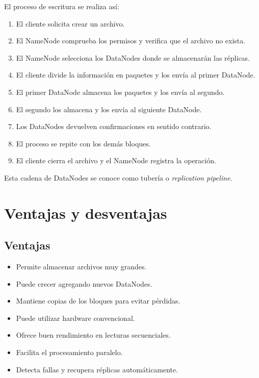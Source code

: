 El proceso de escritura se realiza así:

\begin{enumerate}
    \item El cliente solicita crear un archivo.
    \item El NameNode comprueba los permisos y verifica que el archivo no
    exista.
    \item El NameNode selecciona los DataNodes donde se almacenarán las
    réplicas.
    \item El cliente divide la información en paquetes y los envía al primer
    DataNode.
    \item El primer DataNode almacena los paquetes y los envía al segundo.
    \item El segundo los almacena y los envía al siguiente DataNode.
    \item Los DataNodes devuelven confirmaciones en sentido contrario.
    \item El proceso se repite con los demás bloques.
    \item El cliente cierra el archivo y el NameNode registra la operación.
\end{enumerate}

Esta cadena de DataNodes se conoce como tubería o
\textit{replication pipeline}.

\section{Ventajas y desventajas}

\subsection{Ventajas}

\begin{itemize}
    \item Permite almacenar archivos muy grandes.
    \item Puede crecer agregando nuevos DataNodes.
    \item Mantiene copias de los bloques para evitar pérdidas.
    \item Puede utilizar hardware convencional.
    \item Ofrece buen rendimiento en lecturas secuenciales.
    \item Facilita el procesamiento paralelo.
    \item Detecta fallas y recupera réplicas automáticamente.
\end{itemize}

